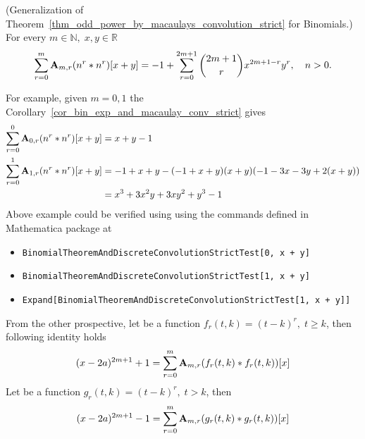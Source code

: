 \begin{cor}
    \label{cor_bin_exp_and_macaulay_conv_strict}
    (Generalization of Theorem~\ref{thm_odd_power_by_macaulays_convolution_strict} for Binomials.)
    For every $m\in\mathbb{N}, \; x,y\in\mathbb{R}$
    \begin{equation*}
        \sum_{r=0}^{m} {\mathbf{A}} \sb{m,r} (n \sp{r} \ast n \sp{r}) [x+y]
        =
        -1 + \sum_{r=0}^{2m+1} \binom{2m+1}{r} x^{2m+1-r} y^r, \quad n > 0.
    \end{equation*}
\end{cor}
For example, given $m=0,1$ the Corollary~\ref{cor_bin_exp_and_macaulay_conv_strict} gives
\begin{equation*}
    \begin{split}
        \sum_{r=0}^{0} {\mathbf{A}} \sb{0,r} (n \sp{r} \ast n \sp{r}) [x+y]
        &= x + y - 1 \\
        \sum_{r=0}^{1} {\mathbf{A}} \sb{1,r} (n \sp{r} \ast n \sp{r}) [x+y]
        &= -1 + x + y - (-1 + x + y) (x + y) (-1 - 3 x - 3 y + 2 (x + y)) \\
        &= x^3 + 3 x^2 y + 3 x y^2 + y^3 - 1
    \end{split}
\end{equation*}
Above example could be verified using using the commands defined in Mathematica package at~\cite{github_source_files}
\begin{itemize}
    \item \texttt{BinomialTheoremAndDiscreteConvolutionStrictTest[0, x + y]}
    \item \texttt{BinomialTheoremAndDiscreteConvolutionStrictTest[1, x + y]}
    \item \texttt{Expand[BinomialTheoremAndDiscreteConvolutionStrictTest[1, x + y]]}
\end{itemize}
From the other prospective, let be a function $f_r(t,k) = (t-k)^r, \; t \geq k$, then following identity holds
\begin{equation}
(x-2a)
    ^{2m+1} + 1 =\sum_{r=0}^{m} {\mathbf{A}} \sb{m,r} (f_r(t,k) \ast f_r(t,k))[x]
    \label{eq:parametric-identity}
\end{equation}
Let be a function $g_r(t,k) = (t-k)^r, \; t > k$, then
\begin{equation}
(x-2a)
    ^{2m+1} - 1 =\sum_{r=0}^{m} {\mathbf{A}} \sb{m,r} (g_r(t,k) \ast g_r(t,k))[x]
    \label{eq:parametric-identity-strict}
\end{equation}

